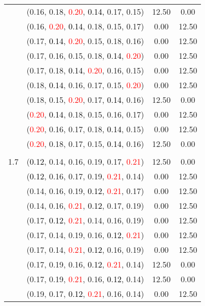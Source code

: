 \documentclass[10pt,a4paper]{report}
\begin{document}
\begin{center}
\begin{longtable}{clcc}
			&(0.16, 0.18, \textcolor{red}{0.20}, \textcolor{black}{0.14}, 0.17, 0.15)&12.50&0.00\\
			&(0.16, \textcolor{red}{0.20}, \textcolor{black}{0.14}, 0.18, 0.15, 0.17)&0.00&12.50\\
			&(0.17, \textcolor{black}{0.14}, \textcolor{red}{0.20}, 0.15, 0.18, 0.16)&0.00&12.50\\
			&(0.17, 0.16, 0.15, 0.18, \textcolor{black}{0.14}, \textcolor{red}{0.20})&0.00&12.50\\
			&(0.17, 0.18, \textcolor{black}{0.14}, \textcolor{red}{0.20}, 0.16, 0.15)&0.00&12.50\\
			&(0.18, \textcolor{black}{0.14}, 0.16, 0.17, 0.15, \textcolor{red}{0.20})&0.00&12.50\\
			&(0.18, 0.15, \textcolor{red}{0.20}, 0.17, \textcolor{black}{0.14}, 0.16)&12.50&0.00\\
			&(\textcolor{red}{0.20}, \textcolor{black}{0.14}, 0.18, 0.15, 0.16, 0.17)&0.00&12.50\\
			&(\textcolor{red}{0.20}, 0.16, 0.17, 0.18, \textcolor{black}{0.14}, 0.15)&0.00&12.50\\
			&(\textcolor{red}{0.20}, 0.18, 0.17, 0.15, \textcolor{black}{0.14}, 0.16)&12.50&0.00\\
		&&&\\
		1.7			&(\textcolor{black}{0.12}, 0.14, 0.16, 0.19, 0.17, \textcolor{red}{0.21})&12.50&0.00\\
			&(\textcolor{black}{0.12}, 0.16, 0.17, 0.19, \textcolor{red}{0.21}, 0.14)&0.00&12.50\\
			&(0.14, 0.16, 0.19, \textcolor{black}{0.12}, \textcolor{red}{0.21}, 0.17)&0.00&12.50\\
			&(0.14, 0.16, \textcolor{red}{0.21}, \textcolor{black}{0.12}, 0.17, 0.19)&0.00&12.50\\
			&(0.17, \textcolor{black}{0.12}, \textcolor{red}{0.21}, 0.14, 0.16, 0.19)&0.00&12.50\\
			&(0.17, 0.14, 0.19, 0.16, \textcolor{black}{0.12}, \textcolor{red}{0.21})&0.00&12.50\\
			&(0.17, 0.14, \textcolor{red}{0.21}, \textcolor{black}{0.12}, 0.16, 0.19)&0.00&12.50\\
			&(0.17, 0.19, 0.16, \textcolor{black}{0.12}, \textcolor{red}{0.21}, 0.14)&12.50&0.00\\
			&(0.17, 0.19, \textcolor{red}{0.21}, 0.16, \textcolor{black}{0.12}, 0.14)&12.50&0.00\\
			&(0.19, 0.17, \textcolor{black}{0.12}, \textcolor{red}{0.21}, 0.16, 0.14)&0.00&12.50\\

\end{longtable}
\end{center}
\end{document}
